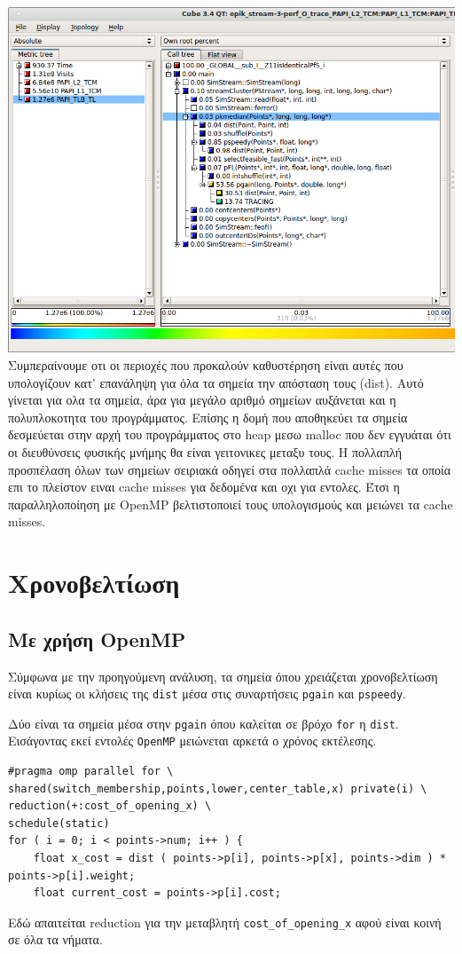 \documentclass[a4paper,11pt]{article}
\begin{document}
\includegraphics[width=\textwidth]{../scrshots/tlb.png}
Συμπεραίνουμε οτι οι περιοχές που προκαλούν καθυστέρηση είναι αυτές που υπολογίζουν κατ' επανάληψη για όλα τα σημεία την απόσταση τους (dist). Αυτό γίνεται για ολα τα σημεία, άρα για μεγάλο αριθμό σημείων αυξάνεται και η πολυπλοκοτητα του προγράμματος. Επίσης η δομή που αποθηκεύει τα σημεία δεσμεύεται στην αρχή του προγράμματος στο heap μεσω malloc που δεν εγγυάται ότι οι διευθύνσεις φυσικής μνήμης θα είναι γειτονικες μεταξυ τους. Η πολλαπλή προσπέλαση όλων των σημείων σειριακά οδηγεί στα πολλαπλά cache misses τα οποία επι το πλείστον ειναι cache misses για δεδομένα και οχι για εντολες. Έτσι η παραλληλοποίηση με OpenMP βελτιστοποιεί τους υπολογισμούς και μειώνει τα cache misses.

\section{Χρονοβελτίωση}
\subsection{Με χρήση OpenMP}
Σύμφωνα με την προηγούμενη ανάλυση, τα σημεία όπου χρειάζεται χρονοβελτίωση είναι κυρίως οι κλήσεις της \texttt{dist} μέσα στις συναρτήσεις \texttt{pgain} και \texttt{pspeedy}.

Δύο είναι τα σημεία μέσα στην \texttt{pgain} όπου καλείται σε βρόχο \texttt{for} η \texttt{dist}. Εισάγοντας εκεί εντολές \texttt{OpenMP} μειώνεται αρκετά ο χρόνος εκτέλεσης.
\begin{lstlisting}
#pragma omp parallel for \
shared(switch_membership,points,lower,center_table,x) private(i) \
reduction(+:cost_of_opening_x) \
schedule(static)
for ( i = 0; i < points->num; i++ ) {
    float x_cost = dist ( points->p[i], points->p[x], points->dim ) * points->p[i].weight;
    float current_cost = points->p[i].cost;
\end{lstlisting}
Εδώ απαιτείται reduction για την μεταβλητή \texttt{cost\_of\_opening\_x} αφού είναι κοινή σε όλα τα νήματα.
\end{document}
